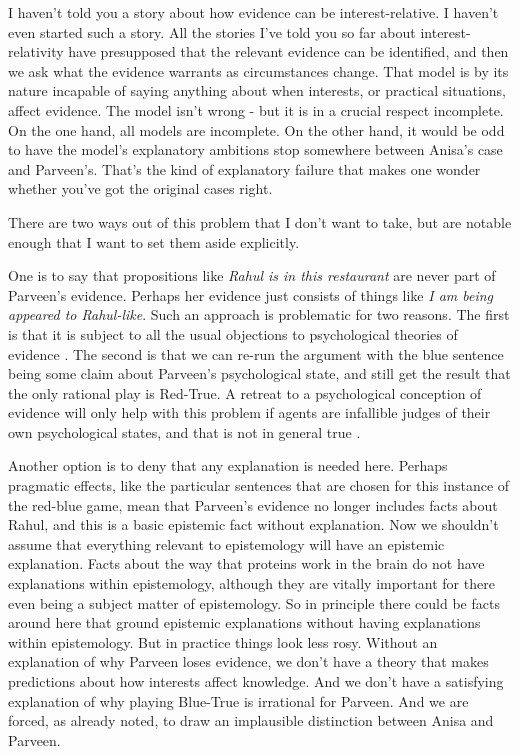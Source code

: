 \documentclass[11pt,]{book}
\begin{document}
I haven't told you a story about how evidence can be interest-relative. I haven't even started such a story. All the stories I've told you so far about interest-relativity have presupposed that the relevant evidence can be identified, and then we ask what the evidence warrants as circumstances change. That model is by its nature incapable of saying anything about when interests, or practical situations, affect evidence. The model isn't wrong - but it is in a crucial respect incomplete. On the one hand, all models are incomplete. On the other hand, it would be odd to have the model's explanatory ambitions stop somewhere between Anisa's case and Parveen's. That's the kind of explanatory failure that makes one wonder whether you've got the original cases right.

There are two ways out of this problem that I don't want to take, but are notable enough that I want to set them aside explicitly.

One is to say that propositions like \emph{Rahul is in this restaurant} are never part of Parveen's evidence. Perhaps her evidence just consists of things like \emph{I am being appeared to Rahul-like}. Such an approach is problematic for two reasons. The first is that it is subject to all the usual objections to psychological theories of evidence \citep{Williamson2007}. The second is that we can re-run the argument with the blue sentence being some claim about Parveen's psychological state, and still get the result that the only rational play is Red-True. A retreat to a psychological conception of evidence will only help with this problem if agents are infallible judges of their own psychological states, and that is not in general true \citep{Schwitzgebel2008}.

Another option is to deny that any explanation is needed here. Perhaps pragmatic effects, like the particular sentences that are chosen for this instance of the red-blue game, mean that Parveen's evidence no longer includes facts about Rahul, and this is a basic epistemic fact without explanation. Now we shouldn't assume that everything relevant to epistemology will have an epistemic explanation. Facts about the way that proteins work in the brain do not have explanations within epistemology, although they are vitally important for there even being a subject matter of epistemology. So in principle there could be facts around here that ground epistemic explanations without having explanations within epistemology. But in practice things look less rosy. Without an explanation of why Parveen loses evidence, we don't have a theory that makes predictions about how interests affect knowledge. And we don't have a satisfying explanation of why playing Blue-True is irrational for Parveen. And we are forced, as already noted, to draw an implausible distinction between Anisa and Parveen.
\end{document}
